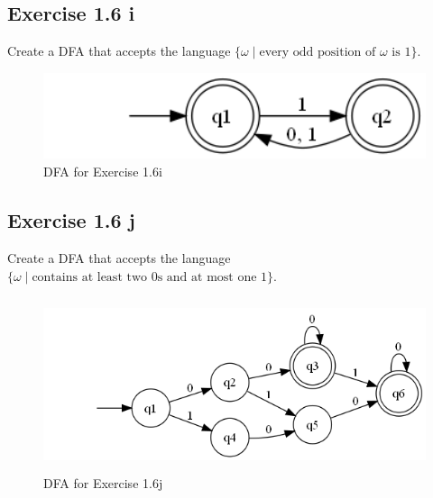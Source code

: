 \documentclass{article}
\newcommand{\where}{\mid}
\begin{document}
\subsection{Exercise 1.6 i}

Create a DFA that accepts the language $\{ \omega \where \text{every odd
position of } \omega \text{ is } 1 \}$.

\begin{figure}[h!]
	\includegraphics[height=1.0in]{1_6_i.png}
	\caption{DFA for Exercise 1.6i}
\end{figure}

\subsection{Exercise 1.6 j}

Create a DFA that accepts the language $\{ \omega \where \text{contains at
least two 0s and at most one 1} \}$.

\begin{figure}[h!]
	\includegraphics[height=2.0in]{1_6_j.png}
	\caption{DFA for Exercise 1.6j}
\end{figure}

\section{}

\section{}
\end{document}
